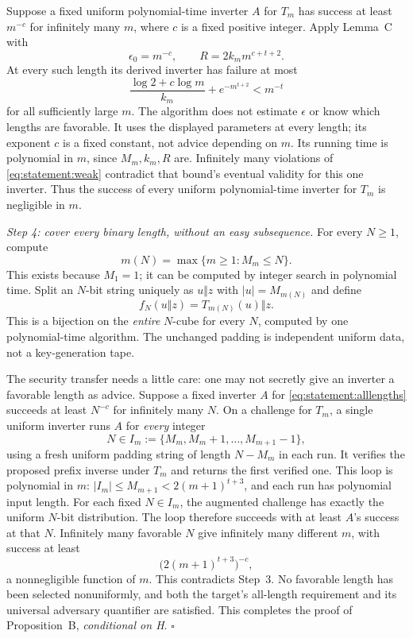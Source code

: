 \documentclass[11pt,a4paper]{article}
\numberwithin{equation}{section}
\begin{document}
Suppose a fixed uniform polynomial-time inverter $A$ for $T_m$ has
success at least $m^{-c}$ for infinitely many $m$, where $c$ is a fixed
positive integer. Apply Lemma~C with
\[
 \epsilon_0=m^{-c},\qquad R=2k_m m^{c+t+2}.
\]
At every such length its derived inverter has failure at most
\begin{equation}\label{eq:statement:contradiction}
 \frac{\log 2+c\log m}{k_m}+e^{-m^{t+2}}
       < m^{-t}
\end{equation}
for all sufficiently large $m$. The algorithm does not estimate
$\epsilon$ or know which lengths are favorable. It uses the displayed
parameters at every length; its exponent $c$ is a fixed constant, not
advice depending on $m$. Its running time is polynomial in $m$, since
$M_m,k_m,R$ are. Infinitely many violations of \eqref{eq:statement:weak}
contradict that bound's eventual validity for this one inverter.
Thus the success of every uniform polynomial-time inverter for $T_m$
is negligible in $m$.

\textit{Step 4: cover every binary length, without an easy subsequence.}
For every $N\ge1$, compute
\[
 m(N)=\max\{m\ge1:M_m\le N\}.
\]
This exists because $M_1=1$; it can be computed by integer search in
polynomial time. Split an $N$-bit string uniquely as
$u\Vert z$ with $|u|=M_{m(N)}$ and define
\begin{equation}\label{eq:statement:alllengths}
 f_N(u\Vert z)=T_{m(N)}(u)\Vert z.
\end{equation}
This is a bijection on the \emph{entire} $N$-cube for every $N$, computed
by one polynomial-time algorithm. The unchanged padding is independent
uniform data, not a key-generation tape.

The security transfer needs a little care: one may not secretly give
an inverter a favorable length as advice. Suppose a fixed inverter $A$
for \eqref{eq:statement:alllengths} succeeds at least $N^{-c}$ for infinitely
many $N$. On a challenge for $T_m$, a single uniform inverter runs $A$
for \emph{every} integer
\[
 N\in I_m:=\{M_m,M_m+1,\ldots,M_{m+1}-1\},
\]
using a fresh uniform padding string of length $N-M_m$ in each run.
It verifies the proposed prefix inverse under $T_m$ and returns the
first verified one. This loop is polynomial in $m$:
$|I_m|\le M_{m+1}<2(m+1)^{t+3}$, and each run has polynomial input length.
For each fixed $N\in I_m$, the augmented challenge has exactly the
uniform $N$-bit distribution. The loop therefore succeeds with at least
$A$'s success at that $N$. Infinitely many favorable $N$ give infinitely
many different $m$, with success at least
\[
 \bigl(2(m+1)^{t+3}\bigr)^{-c},
\]
a nonnegligible function of $m$. This contradicts Step~3. No favorable
length has been selected nonuniformly, and both the target's
all-length requirement and its universal adversary quantifier are
satisfied. This completes the proof of Proposition~B, \emph{conditional
on H}. \hfill$\square$
\end{document}
